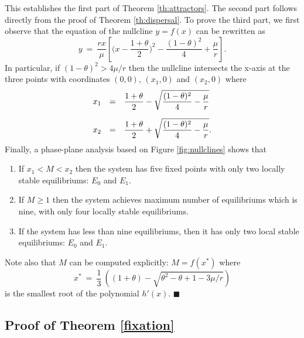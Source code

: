  This establishes the first part of Theorem \ref{th:attractors}.
 The second part follows directly from the proof of Theorem \ref{th:dispersal}.
 To prove the third part, we first observe that the equation of the nullcline $y = f (x)$ can be rewritten as
 $$ y \ = \ \frac{r x}{\mu} \left[\bigg(x - \frac{1 + \theta}{2} \bigg)^2 - \frac{(1 - \theta)^2}{4} + \frac{\mu}{r} \right]. $$
 In particular, if $(1 - \theta)^2 > 4 \mu / r$ then the nullcline intersects the x-axis at the three points with coordinates
 $(0, 0)$, $(x_1, 0)$ and $(x_2, 0)$ where
 $$ \begin{array}{rcl}
     x_1 & = & \displaystyle \frac{1 + \theta}{2} - \sqrt{\frac{(1 - \theta)^2}{4} - \frac{\mu}{r}} \vspace{10pt} \\
     x_2 & = & \displaystyle \frac{1 + \theta}{2} + \sqrt{\frac{(1 - \theta)^2}{4} - \frac{\mu}{r}}. \end{array} $$
 Finally, a phase-plane analysis based on Figure \ref{fig:nullclines} shows that
\begin{enumerate}
 \item If $x_1 < M < x_2$ then the system has five fixed points with only two locally stable equilibriums: $E_0$ and $E_1$. \vspace{4pt}
 \item If $M \geq 1$ then the system achieves maximum number of equilibriums which is nine, with only four locally stable equilibriums. \vspace{4pt}
 \item If the system has less than nine equilibriums, then it has only two local stable equilibriums: $E_0$ and $E_1$.
\end{enumerate}
 Note also that $M$ can be computed explicitly: $M = f (x^*)$ where
 $$ x^* \ = \ \frac{1}{3} \ \left((1 + \theta) - \sqrt{\theta^2 - \theta + 1 - 3 \mu / r} \right) $$
 is the smallest root of the polynomial $h' (x)$. \hspace{2mm} $\blacksquare$

\subsection*{Proof of Theorem \ref{fixation}}

